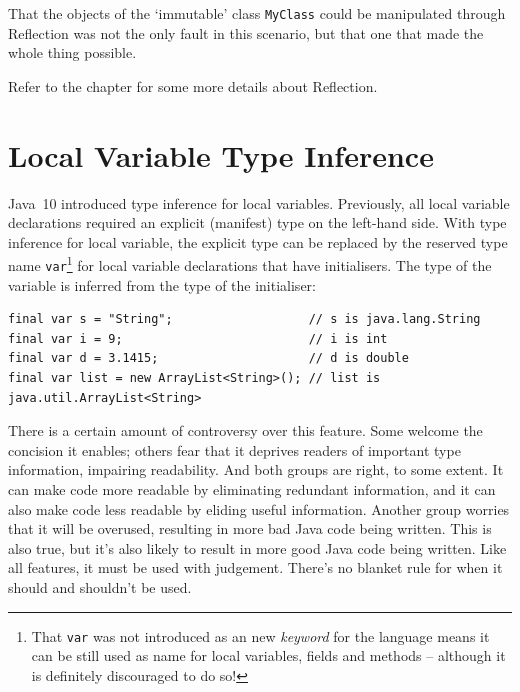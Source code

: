 That the objects of the ‘immutable’ class \lstinline|MyClass| could be manipulated through Reflection was not the only fault in this scenario, but that one that made the whole thing possible.

Refer to the chapter  for some more details about Reflection.


\section{Local Variable Type Inference}\label{sec:LocalVariableTypeInference}
Java~10 introduced type inference\autocite{ORACLE_DOC_LANGUAGE_SPECIFICATION:TypeInference} for local variables\autocite{ORACLE_DOC_LANGUAGE_SPECIFICATION:LocalVariableDeclarations,Marks:LocalVariableTypeInference,Urma:LocalVariableTypeInference}. Previously, all local variable declarations required an explicit (manifest) type on the left-hand side. With type inference for local variable, the explicit type can be replaced by the reserved type name \lstinline|var|\footnote{That \lstinline|var| was not introduced as an new \textit{keyword} for the language means it can be still used as name for local variables, fields and methods – although it is definitely discouraged to do so!} for local variable declarations that have initialisers. The type of the variable is inferred from the type of the initialiser:
\begin{lstlisting}
final var s = "String";                   // s is java.lang.String
final var i = 9;                          // i is int
final var d = 3.1415;                     // d is double
final var list = new ArrayList<String>(); // list is java.util.ArrayList<String>
\end{lstlisting}

There is a certain amount of controversy over this feature. Some welcome the concision it enables; others fear that it deprives readers of important type information, impairing readability. And both groups are right, to some extent. It can make code more readable by eliminating redundant information, and it can also make code less readable by eliding useful information. Another group worries that it will be overused, resulting in more bad Java code being written. This is also true, but it’s also likely to result in more good Java code being written. Like all features, it must be used with judgement. There’s no blanket rule for when it should and shouldn’t be used. 

